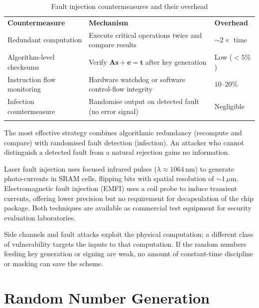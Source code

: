 \begin{table}[t]
\caption{Fault injection countermeasures and their overhead}
\label{tab:fault-countermeasures}
\begin{tabular}{p{3cm}p{5cm}p{3cm}}
\hline\noalign{\smallskip}
\textbf{Countermeasure} & \textbf{Mechanism} & \textbf{Overhead} \\
\noalign{\smallskip}\svhline\noalign{\smallskip}
Redundant computation & Execute critical operations twice and compare results & $\sim\!2\times$ time \\
Algorithm-level checksums & Verify $\mathbf{A}\mathbf{s} + \mathbf{e} = \mathbf{t}$ after key generation & Low ($< 5\%$) \\
Instruction flow monitoring & Hardware watchdog or software control-flow integrity & $10$--$20\%$ \\
Infection countermeasure & Randomise output on detected fault (no error signal) & Negligible \\
\noalign{\smallskip}\hline
\end{tabular}
\end{table}

The most effective strategy combines algorithmic redundancy (recompute and compare) with randomised fault detection (infection).  An attacker who cannot distinguish a detected fault from a natural rejection gains no information.

\begin{remark}
Laser fault injection uses focused infrared pulses ($\lambda \approx 1064\,\mathrm{nm}$) to generate photo-currents in SRAM cells, flipping bits with spatial resolution of $\sim\!1\,\mu\mathrm{m}$.  Electromagnetic fault injection (EMFI) uses a coil probe to induce transient currents, offering lower precision but no requirement for decapsulation of the chip package.  Both techniques are available as commercial test equipment for security evaluation laboratories.
\end{remark}

Side channels and fault attacks exploit the physical computation; a different class of vulnerability targets the inputs to that computation.  If the random numbers feeding key generation or signing are weak, no amount of constant-time discipline or masking can save the scheme.


\section{Random Number Generation}
\label{sec:rng}

